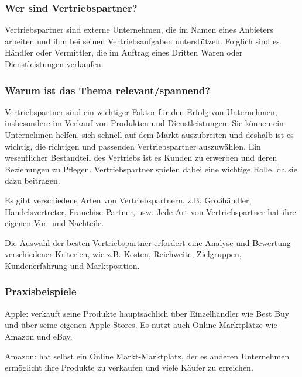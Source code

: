 \begin{refsection}
  
  \subsubsection*{Wer sind Vertriebspartner?}
  Vertriebspartner sind externe Unternehmen, die im Namen eines Anbieters arbeiten und ihm bei seinen Vertriebsaufgaben unterstützen. Folglich sind es Händler oder Vermittler, die im Auftrag eines Dritten Waren oder Dienstleistungen verkaufen.
  \subsubsection*{Warum ist das Thema relevant/spannend?}
  Vertriebspartner sind ein wichtiger Faktor für den Erfolg von Unternehmen, insbesondere im Verkauf von Produkten und Dienstleistungen. Sie können ein Unternehmen helfen, sich schnell auf dem Markt auszubreiten und deshalb ist es wichtig, die richtigen und passenden Vertriebspartner auszuwählen. Ein wesentlicher Bestandteil des Vertriebs ist es Kunden zu erwerben und deren Beziehungen zu Pflegen. Vertriebspartner spielen dabei eine wichtige Rolle, da sie dazu beitragen.

  Es gibt verschiedene Arten von Vertriebspartnern, z.B. Gro\ss{}händler, Handelsvertreter, Franchise-Partner, usw. Jede Art von Vertriebspartner hat ihre eigenen Vor- und Nachteile.

  Die Auswahl der besten Vertriebspartner erfordert eine Analyse und Bewertung verschiedener Kriterien, wie z.B. Kosten, Reichweite, Zielgruppen, Kundenerfahrung und Marktposition.

  \subsubsection*{Praxisbeispiele}
  Apple: verkauft seine Produkte hauptsächlich über Einzelhändler wie Best Buy und über seine eigenen Apple Stores. Es nutzt auch Online-Marktplätze wie Amazon und eBay. 

  Amazon: hat selbst ein Online Markt-Marktplatz, der es anderen Unternehmen ermöglicht ihre Produkte zu verkaufen und viele Käufer zu erreichen.
  \clearpage
  \printbibliography[heading=subsubbibliography]
\end{refsection}
\clearpage
